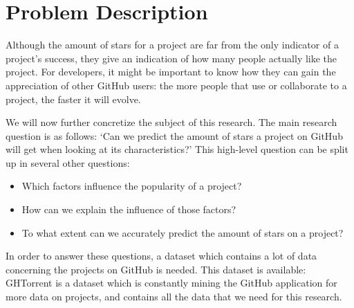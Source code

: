 \section{Problem Description}
    Although the amount of stars for a project are far from the only indicator of a project's success, they give an indication of how many people actually like the project.
    For developers, it might be important to know how they can gain the appreciation of other GitHub users: the more people that use or collaborate to a project, the faster it will evolve.

    We will now further concretize the subject of this research. 
    The main research question is as follows: `Can we predict the amount of stars a project on GitHub will get when looking at its characteristics?'
    This high-level question can be split up in several other questions:
    \begin{itemize}
        \item Which factors influence the popularity of a project?
        \item How can we explain the influence of those factors?
        \item To what extent can we accurately predict the amount of stars on a project?
    \end{itemize}
    
    In order to answer these questions, a dataset which contains a lot of data concerning the projects on GitHub is needed. 
    This dataset is available: GHTorrent \cite{gousios-2013} is a dataset which is constantly mining the GitHub application for more data on projects, and contains all the data that we need for this research.



